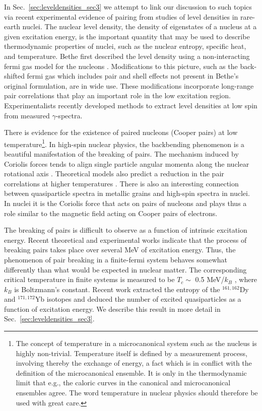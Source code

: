 \documentclass[rmp,preprint,aps,floatfix]{revtex4}
\begin{document}
In Sec.~\ref{sec:leveldensities_sec3} we attempt to link our discussion
to such topics via 
recent experimental evidence of pairing from studies
of level densities in rare-earth nuclei. 
The nuclear level density, the density of eigenstates of a nucleus
at a given excitation energy, is the important quantity that may be
used to describe thermodynamic properties of nuclei, such as the
nuclear entropy, specific heat, and temperature.
Bethe first described the level density using a
non-interacting fermi gas model
for the nucleons \cite{bethe1}. Modifications to this picture, such as the
back-shifted fermi gas which includes pair and
shell effects \cite{back_shift,newton56}
not present in Bethe's original formulation, are in
wide use.  These modifications incorporate 
long-range pair correlations that play an important role
in the low excitation region.
Experimentalists recently developed methods
\cite{oslo1,oslo2} to extract level densities at low spin from
measured $\gamma$-spectra. 

There is evidence for the existence of paired nucleons 
(Cooper pairs) at low temperature\footnote{The concept of temperature
in a microcanonical system such as the nucleus is highly non-trivial. 
Temperature itself is defined by a measurement process, involving
thereby the exchange of energy, a fact which is in conflict with the definition
of the  microcanonical ensemble. It is only in the thermodynamic 
limit that e.g., the caloric curves in the canonical and microcanonical
ensembles agree. The word temperature in nuclear physics should therefore
be used with great care.}. In high-spin nuclear physics, 
the backbending phenomenon is a beautiful manifestation of 
the breaking of pairs. The mechanism induced by Coriolis 
forces tends to align single particle angular momenta along 
the nuclear rotational axis 
\cite{stephenssimon,johnson1971,ried80,faessler76}. 
Theoretical models also 
predict a reduction in the pair correlations at 
higher temperatures \cite{mottelson60,muhlhans83,dossing95}.
There is also an interesting connection between quasiparticle spectra
in metallic grains and high-spin spectra in nuclei. In nuclei it is the 
Coriolis force that acts on pairs of nucleons and plays thus a
role similar to the magnetic field acting on Cooper pairs of electrons.

The breaking of pairs is difficult to observe as a 
function of intrinsic excitation energy. Recent 
theoretical \cite{dossing95} and experimental \cite{oslo2,oslo3} works 
indicate that the process of breaking pairs takes place 
over several MeV of excitation energy. Thus, the 
phenomenon of pair breaking in a finite-fermi system behaves 
somewhat differently than what would be expected in nuclear matter. 
The corresponding critical 
temperature in finite systems is measured to be 
$T_c \sim $ 0.5 MeV/$k_B$ \cite{schiller2001}, 
where $k_B$ is Boltzmann's constant.
Recent work extracted the entropy of the 
$^{161,162}$Dy and $^{171,172}$Yb isotopes and deduced the 
number of excited quasiparticles as a function of excitation energy. 
We describe this result in more detail in 
Sec.~\ref{sec:leveldensities_sec3}.
\end{document}
